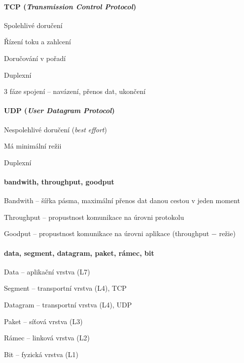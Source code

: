 \paragraph*{TCP (\textit{Transmission Control Protocol})} \begin{compactitem}
    \item Spolehlivé doručení
    \item Řízení toku a zahlcení
    \item Doručování v pořadí
    \item Duplexní
    \item 3 fáze spojení -- navázení, přenos dat, ukončení
\end{compactitem}

\paragraph*{UDP (\textit{User Datagram Protocol})} \begin{compactitem}
    \item Nespolehlivé doručení (\textit{best effort})
    \item Má minimální režii
    \item Duplexní
\end{compactitem}

\paragraph*{bandwith, throughput, goodput} \begin{compactitem}
    \item Bandwith -- šířka pásma, maximální přenos dat danou cestou v jeden moment
    \item Throughput -- propustnost komunikace na úrovni protokolu
    \item Goodput -- propustnost komunikace na úrovni aplikace (throughput $-$ režie)
\end{compactitem}

\paragraph*{data, segment, datagram, paket, rámec, bit} \begin{compactitem}
    \item Data -- aplikační vrstva (L7)
    \item Segment -- transportní vrstva (L4), TCP
    \item Datagram -- transportní vrstva (L4), UDP
    \item Paket -- síťová vrstva (L3)
    \item Rámec -- linková vrstva (L2)
    \item Bit -- fyzická vrstva (L1)
\end{compactitem}

